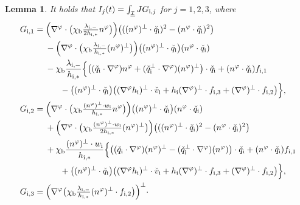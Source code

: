 \documentclass[10pt]{amsart}
\newcommand{\cI}{{\mathcal I}}
\newcommand{\ul}[1]{\underline{#1}}
\newtheorem{lemma}[theorem]{Lemma}
\theoremstyle{definition}
\begin{document}
\begin{lemma}\label{lem:Rellich2}
It holds that $I_j(t)=\int_{\ul{\cI}}JG_{{\rm i},j}$ for $j=1,2,3$, where
\begin{align*}
G_{{\rm i},1}
&= \Bigl(\nabla^\varphi\cdot\bigl(\chi_\mathrm{b}\tfrac{\lambda_{{\rm i},-}}{2h_{{\rm i},*}}n^\varphi \bigr) \Bigr)
\bigl(((n^\varphi)^\perp\cdot\check{q}_\mathrm{i})^2 - (n^\varphi\cdot\check{q}_\mathrm{i})^2\bigr) \\
&\quad\;
- \Bigl(\nabla^\varphi\cdot\bigl(\chi_\mathrm{b}\tfrac{\lambda_{{\rm i},-}}{h_{{\rm i},*}}(n^\varphi)^\perp \bigr) \Bigr)
\bigl((n^\varphi)^\perp\cdot\check{q}_\mathrm{i}\bigr)(n^\varphi\cdot\check{q}_\mathrm{i}) \\
&\quad\;
- \chi_\mathrm{b}\frac{\lambda_{{\rm i},-}}{h_{{\rm i},*}}\Bigl\{
\bigl((\check{q}_\mathrm{i}\cdot\nabla^\varphi)n^\varphi + (\check{q}_\mathrm{i}^\perp\cdot\nabla^\varphi)(n^\varphi)^\perp \bigr)\cdot\check{q}_\mathrm{i}
+ (n^\varphi\cdot\check{q}_\mathrm{i})f_{{\rm i},1} \\
&\makebox[3em]{}
- \bigl((n^\varphi)^\perp\cdot\check{q}_\mathrm{i}\bigr)\bigl((\nabla^\varphi h_\mathrm{i})^\perp\cdot\check{v}_\mathrm{i} + h_\mathrm{i}(\nabla^\varphi)^\perp\cdot f_{{\rm i},3}
+ (\nabla^\varphi)^\perp\cdot f_{{\rm i},2}\bigr) \Bigr\}, \\
G_{{\rm i},2}
&= \Bigl(\nabla^\varphi\cdot\bigl(\chi_\mathrm{b}\tfrac{(n^\varphi)^\perp\cdot w_\mathrm{i}}{h_{{\rm i},*}}n^\varphi \bigr) \Bigr)
\bigl((n^\varphi)^\perp\cdot\check{q}_\mathrm{i}\bigr)(n^\varphi\cdot\check{q}_\mathrm{i}) \\
&\quad\;
+ \Bigl(\nabla^\varphi\cdot\bigl(\chi_\mathrm{b}\tfrac{(n^\varphi)^\perp\cdot w_\mathrm{i}}{2h_{{\rm i},*}}(n^\varphi)^\perp \bigr) \Bigr)
\bigl(((n^\varphi)^\perp\cdot\check{q}_\mathrm{i})^2 - (n^\varphi\cdot\check{q}_\mathrm{i})^2\bigr) \\
&\quad\;
+ \chi_\mathrm{b}\frac{(n^\varphi)^\perp\cdot w_\mathrm{i}}{h_{{\rm i},*}}\Bigl\{
\bigl((\check{q}_\mathrm{i}\cdot\nabla^\varphi)(n^\varphi)^\perp - (\check{q}_\mathrm{i}^\perp\cdot\nabla^\varphi)(n^\varphi) \bigr)\cdot\check{q}_\mathrm{i}
+ (n^\varphi\cdot\check{q}_\mathrm{i})f_{{\rm i},1} \\
&\makebox[3em]{}
+ \bigl((n^\varphi)^\perp\cdot\check{q}_\mathrm{i}\bigr)\bigl((\nabla^\varphi h_\mathrm{i})^\perp\cdot\check{v}_\mathrm{i} + h_\mathrm{i}(\nabla^\varphi)^\perp\cdot f_{{\rm i},3}
+ (\nabla^\varphi)^\perp\cdot f_{{\rm i},2}\bigl) \Bigr\}, \\
G_{{\rm i},3}
&= \Bigl(\nabla^\varphi\bigl(\chi_\mathrm{b}\tfrac{\lambda_{{\rm i},-}}{h_{{\rm i},*}}(n^\varphi)^\perp\cdot f_{{\rm i},2} \bigr) \Bigr)^\perp\cdot

\end{align*}
\end{lemma}
\end{document}
